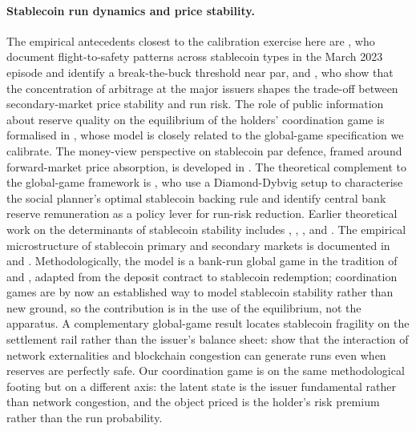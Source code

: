 \paragraph{Stablecoin run dynamics and price stability.} The empirical antecedents closest to the calibration exercise here are \citet{anadu_etal_2023_runs}, who document flight-to-safety patterns across stablecoin types in the March 2023 episode and identify a break-the-buck threshold near par, and \citet{ma_zeng_zhang_2025}, who show that the concentration of arbitrage at the major issuers shapes the trade-off between secondary-market price stability and run risk. The role of public information about reserve quality on the equilibrium of the holders' coordination game is formalised in \citet{ahmed_aldasoro_duley_2025}, whose model is closely related to the global-game specification we calibrate. The money-view perspective on stablecoin par defence, framed around forward-market price absorption, is developed in \citet{aldasoro_mehrling_neilson_2023}. The theoretical complement to the global-game framework is \citet{li_mancini_griffoli_etal_2026}, who use a Diamond-Dybvig setup to characterise the social planner's optimal stablecoin backing rule and identify central bank reserve remuneration as a policy lever for run-risk reduction. Earlier theoretical work on the determinants of stablecoin stability includes \citet{routledge_zetlin_jones_2022}, \citet{liao_2021}, \citet{lyons_viswanath_natraj_2023}, and \citet{li_mayer_2024}. The empirical microstructure of stablecoin primary and secondary markets is documented in \citet{watsky_etal_2024} and \citet{du_sonawane_watsky_2025}. Methodologically, the model is a bank-run global game in the tradition of \citet{morris_shin_1998} and \citet{goldstein_pauzner_2005_demand_deposits}, adapted from the deposit contract to stablecoin redemption; coordination games are by now an established way to model stablecoin stability rather than new ground, so the contribution is in the use of the equilibrium, not the apparatus. A complementary global-game result locates stablecoin fragility on the settlement rail rather than the issuer's balance sheet: \citet{klee_etal_2026_fragility} show that the interaction of network externalities and blockchain congestion can generate runs even when reserves are perfectly safe. Our coordination game is on the same methodological footing but on a different axis: the latent state is the issuer fundamental rather than network congestion, and the object priced is the holder's risk premium rather than the run probability.

